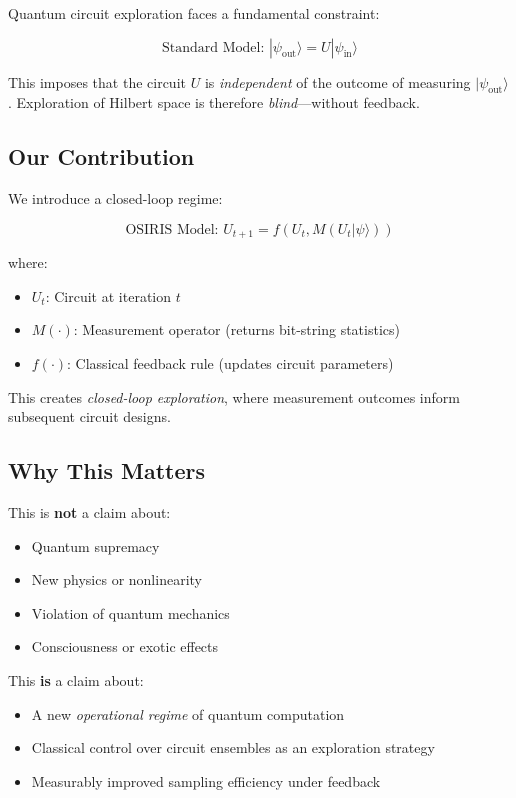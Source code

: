\documentclass[twocolumn]{article}
\begin{document}
Quantum circuit exploration faces a fundamental constraint:

\begin{equation}
\text{Standard Model: } |\psi_{\text{out}}\rangle = U |\psi_{\text{in}}\rangle
\end{equation}

This imposes that the circuit $U$ is \textit{independent} of the outcome of measuring $|\psi_{\text{out}}\rangle$. Exploration of Hilbert space is therefore \textit{blind}---without feedback.

\subsection{Our Contribution}

We introduce a closed-loop regime:

\begin{equation}
\text{OSIRIS Model: } U_{t+1} = f(U_t, M(U_t |\psi\rangle))
\end{equation}

where:
\begin{itemize}
\item $U_t$: Circuit at iteration $t$
\item $M(\cdot)$: Measurement operator (returns bit-string statistics)
\item $f(\cdot)$: Classical feedback rule (updates circuit parameters)
\end{itemize}

This creates \textit{closed-loop exploration}, where measurement outcomes inform subsequent circuit designs.

\subsection{Why This Matters}

This is \textbf{not} a claim about:
\begin{itemize}
\item Quantum supremacy
\item New physics or nonlinearity
\item Violation of quantum mechanics
\item Consciousness or exotic effects
\end{itemize}

This \textbf{is} a claim about:
\begin{itemize}
\item A new \textit{operational regime} of quantum computation
\item Classical control over circuit ensembles as an exploration strategy
\item Measurably improved sampling efficiency under feedback
\end{itemize}
\end{document}
